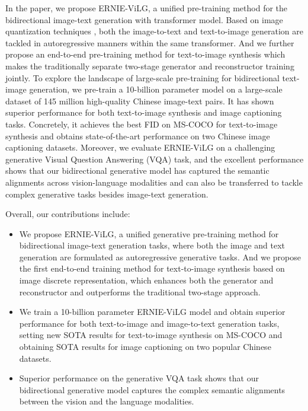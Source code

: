 \documentclass{article}
\begin{document}
In the paper, we propose ERNIE-ViLG, a unified pre-training method for the bidirectional image-text generation with transformer model. Based on image quantization techniques \cite{oord2017neural,ramesh2021zero,esser2021taming}, both the image-to-text and text-to-image generation are tackled in autoregressive manners within the same transformer.
And we further propose an end-to-end pre-training method for text-to-image synthesis which makes the traditionally separate two-stage generator and reconstructor training jointly. 
To explore the landscape of large-scale pre-training for bidirectional text-image generation, we pre-train a 10-billion parameter model on a large-scale dataset of 145 million high-quality Chinese image-text pairs. It has shown superior performance for both text-to-image synthesis and image captioning tasks. Concretely, it achieves the best FID on MS-COCO for text-to-image synthesis and obtains state-of-the-art performance on two Chinese image captioning datasets. Moreover, we evaluate ERNIE-ViLG on a challenging generative Visual Question Answering (VQA) task, and the excellent performance shows that our bidirectional generative model has captured the semantic alignments across vision-language modalities and can also be transferred to tackle complex generative tasks besides image-text generation.

Overall, our contributions include:
\begin{itemize}
\item We propose ERNIE-ViLG, a unified generative pre-training method for bidirectional image-text generation tasks, where both the image and text generation are formulated as autoregressive generative tasks. And we propose the first end-to-end training method for text-to-image synthesis based on image discrete representation, which enhances both the generator and reconstructor and outperforms the traditional two-stage approach.
\item We train a 10-billion parameter ERNIE-ViLG model and obtain superior performance for both text-to-image and image-to-text generation tasks, setting new SOTA results for text-to-image synthesis on MS-COCO and obtaining SOTA results for image captioning on two popular Chinese datasets.
\item Superior performance on the generative VQA task shows that our bidirectional generative model  captures the complex semantic alignments between the vision and the language modalities. 
\end{itemize}
\end{document}
